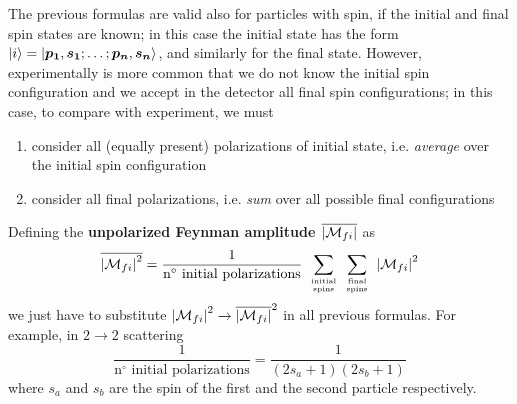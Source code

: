 \documentclass[TheoreticalPhy_ModB.tex]{subfiles}
\begin{document}
The previous formulas are valid also for particles with spin, if the initial and final spin states are known; in this case the initial state has the form $\ket{i} = \ket{\boldsymbol{p_1}, \boldsymbol{s_1}; \dots; \boldsymbol{p_n}, \boldsymbol{s_n}}$, and similarly for the final state.
However, experimentally is more common that we do not know the initial spin configuration and we accept in the detector all final spin configurations; in this case, to compare with experiment, we must
\begin{enumerate}
\item consider all (equally present) polarizations of initial state, i.e. \textit{average} over the initial spin configuration
\item consider all final polarizations, i.e. \textit{sum} over all possible final configurations
\end{enumerate}
Defining the \textbf{unpolarized Feynman amplitude $\overline{\abs{\mathcal{M}_{fi}}}$} as
\[
\overline{\abs{\mathcal{M}_{fi}}^2} = \frac{1}{\textup{$\text{n}^\circ$ initial polarizations}} \
	\sum _{\text{initial} \atop \text{spins}} \ \sum _{\text{final} \atop \text{spins}} \ \abs{\mathcal{M}_{fi}}^{2}
\]
we just have to substitute $\abs{\mathcal{M}_{fi}}^2 \to \overline{\abs{\mathcal{M}_{fi}}}^2$ in all previous formulas.
For example, in $2 \to 2$ scattering
\[
\frac{1}{\text{$\text{n}^\circ$ initial polarizations}} = \frac{1}{(2 s_a + 1)(2 s_b + 1)}
\]
where $s_a$ and $s_b$ are the spin of the first and the second particle respectively.
\end{document}
